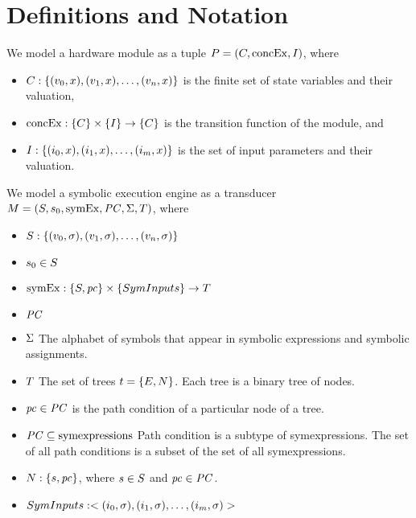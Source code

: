 \section{Definitions and Notation}




We model a hardware module as a tuple $P = (C,
\mathrm{concEx}, I)$, where
\begin{itemize}
\item $C: \{(v_0,x), (v_1,x), \ldots, (v_n,x)\}$ is the finite set of state variables and their valuation,
\item $\mathrm{concEx}: \{C\} \times \{I\} \rightarrow 
  \{C\}$ is the transition function of the module, and
\item $I: \{(i_0,x), (i_1,x),
  \ldots, (i_m,x)\}$ is the set of input parameters and their valuation.
\end{itemize}


We model a symbolic execution engine as a transducer $M =
(S, s_0, \mathrm{symEx}, \mathit{PC}, \Sigma,
T)$, where
\begin{itemize}
\item $S: \{(v_0,\sigma), (v_1,\sigma), \ldots, (v_n,\sigma)\}$
\item $s_0 \in S$
\item $\mathrm{symEx}: \{S,\mathit{pc}\}
  \times \{SymInputs\} \rightarrow T$
\item $\mathit{PC}$
\item $\Sigma$ The alphabet of symbols that appear in symbolic expressions
  and symbolic assignments.
\item $T$ The set of trees $t = \{E,N\}$. Each tree is a binary tree of nodes.
\end{itemize}


\begin{itemize}
\item $\mathit{pc} \in \mathit{PC}$ is the path condition of a particular node of a tree.
\item $\mathit{PC} \subseteq \mathrm{symexpressions}$ Path condition is a subtype of
  symexpressions. The set of all path conditions is a subset of the set of all
  symexpressions.
\item $N: \{s,\mathit{pc}\}$, where $s \in S$
  and $\mathit{pc} \in \mathit{PC}$.
\item $SymInputs: <(i_0, \sigma), (i_1,
  \sigma), \ldots, (i_m, \sigma)>$
\end{itemize}

